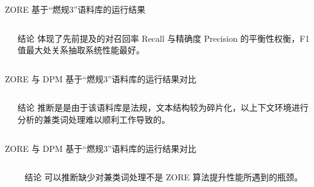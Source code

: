 ﻿\documentclass[12pt]{ctexbeamer}	%
\begin{document}
\begin{frame}{ZORE 基于“燃规3”语料库的运行结果}
  \begin{columns}
    \begin{column}{0.70\textwidth}
    \end{column}
    \begin{column}{0.30\textwidth}
      \begin{block}{结论}
        体现了先前提及的对召回率 Recall 与精确度 Precision 的平衡性权衡，F1 值最大处关系抽取系统性能最好。
      \end{block}
    \end{column}
  \end{columns}
\end{frame}

\begin{frame}{ZORE 与 DPM 基于“燃规3”语料库的运行结果对比}
  \begin{columns}
    \begin{column}{0.70\textwidth}
    \end{column}
    \begin{column}{0.30\textwidth}
      \begin{block}{结论}
        推断是是由于该语料库是法规，文本结构较为碎片化，以上下文环境进行分析的兼类词处理难以顺利工作导致的。
      \end{block}
    \end{column}
  \end{columns}
\end{frame}

\begin{frame}{ZORE 与 DPM 基于“燃规3”语料库的运行结果对比}
  \begin{columns}
    \begin{column}{0.70\textwidth}
    \end{column}
    \begin{column}{0.30\textwidth}
      \begin{block}{结论}
        可以推断缺少对兼类词处理不是 ZORE 算法提升性能所遇到的瓶颈。
      \end{block}
    \end{column}
  \end{columns}
\end{frame}

\end{document}
